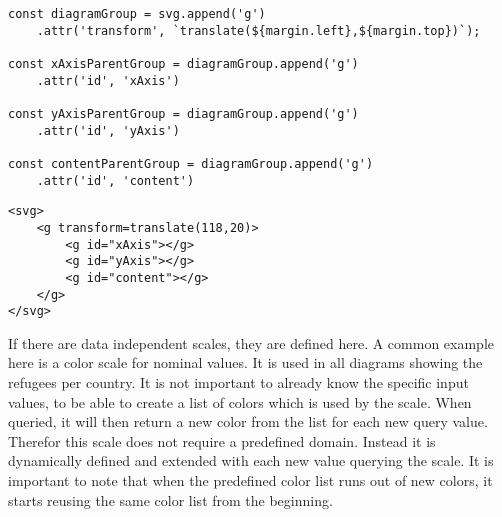 \begin{minipage}{0.9\linewidth}
\begin{lstlisting}[style=htmlcssjs, captionpos=b, caption={JavaScript code to create the hierarchy as used in the bar-chart. The first line adds a new group element to themain SVG container using the \texttt{append} command. The newly added group element is saved in a constant for later references. Furthermore in line two an attribute is added to the new group element using the \texttt{attr} command and method chaining. It moves the group element from the left and top to allign with the margin definition. In each of the lines four, seven and ten, another group element is added. They are added to the previously created group element. They are all stored in constants for later reference and are provided with id's for easier identification and debugging.}, label={lst:hierarchy_creation}]
const diagramGroup = svg.append('g')
    .attr('transform', `translate(${margin.left},${margin.top})`);

const xAxisParentGroup = diagramGroup.append('g')
    .attr('id', 'xAxis')

const yAxisParentGroup = diagramGroup.append('g')
    .attr('id', 'yAxis')

const contentParentGroup = diagramGroup.append('g')
    .attr('id', 'content')
\end{lstlisting}
\begin{lstlisting}[style=htmlcssjs, captionpos=b, caption={The HTML structure which results from the JavaScript code in listing \ref{lst:hierarchy_creation}. The resulting tree structure clearly separates the different aspects of the diagram. Using a hierarchical approach makes not only later selections easier, but also increases human readability and simplyfies debugging.}, label={lst:hierarchy_result}]
<svg>
    <g transform=translate(118,20)>
        <g id="xAxis"></g>
        <g id="yAxis"></g>
        <g id="content"></g>
    </g>
</svg>
    \end{lstlisting}
\end{minipage}


If there are data independent scales, they are defined here. A common example here is a color scale for nominal values. It is used in all diagrams showing the refugees per country. It is not important to already know the specific input values, to be able to create a list of colors which is used by the scale. When queried, it will then return a new color from the list for each new query value. Therefor this scale does not require a predefined domain. Instead it is dynamically defined and extended with each new value querying the scale. It is important to note that when the predefined color list runs out of new colors, it starts reusing the same color list from the beginning.

